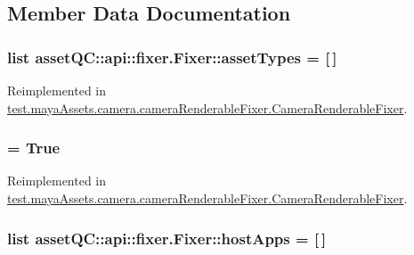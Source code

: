 \subsection{\-Member \-Data \-Documentation}
\hypertarget{classassetQC_1_1api_1_1fixer_1_1Fixer_a7494be1428e0f1d3caaa99b21804eb7b}{
\subsubsection[{asset\-Types}]{\setlength{\rightskip}{0pt plus 5cm}list {\bf asset\-Q\-C\-::api\-::fixer.\-Fixer\-::asset\-Types} = \mbox{[}$\,$\mbox{]}}}\label{d7/da8/classassetQC_1_1api_1_1fixer_1_1Fixer_a7494be1428e0f1d3caaa99b21804eb7b}


\-Reimplemented in \hyperlink{classtest_1_1mayaAssets_1_1camera_1_1cameraRenderableFixer_1_1CameraRenderableFixer_a6cca1a4f570ff623b6f4df7142f4c53b}{test.\-maya\-Assets.\-camera.\-camera\-Renderable\-Fixer.\-Camera\-Renderable\-Fixer}.

\hypertarget{classassetQC_1_1api_1_1fixer_1_1Fixer_a79bfa5d846823a25a68ae323f63bb957}{
\subsubsection[{enable}]{ = \-True}}\label{d7/da8/classassetQC_1_1api_1_1fixer_1_1Fixer_a79bfa5d846823a25a68ae323f63bb957}


\-Reimplemented in \hyperlink{classtest_1_1mayaAssets_1_1camera_1_1cameraRenderableFixer_1_1CameraRenderableFixer_a239eab1751e49ca9480f75e6e00cea9f}{test.\-maya\-Assets.\-camera.\-camera\-Renderable\-Fixer.\-Camera\-Renderable\-Fixer}.

\hypertarget{classassetQC_1_1api_1_1fixer_1_1Fixer_a60a0a99566e6a8b850a323e275d03fd2}{
\subsubsection[{host\-Apps}]{\setlength{\rightskip}{0pt plus 5cm}list {\bf asset\-Q\-C\-::api\-::fixer.\-Fixer\-::host\-Apps} = \mbox{[}$\,$\mbox{]}}}\label{d7/da8/classassetQC_1_1api_1_1fixer_1_1Fixer_a60a0a99566e6a8b850a323e275d03fd2}


